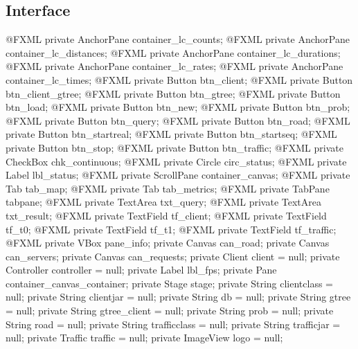 \subsection{Interface}
\nwenddocs{}\plusendmoddef
@FXML private AnchorPane container_lc_counts;
@FXML private AnchorPane container_lc_distances;
@FXML private AnchorPane container_lc_durations;
@FXML private AnchorPane container_lc_rates;
@FXML private AnchorPane container_lc_times;
@FXML private Button btn_client;
@FXML private Button btn_client_gtree;
@FXML private Button btn_gtree;
@FXML private Button btn_load;
@FXML private Button btn_new;
@FXML private Button btn_prob;
@FXML private Button btn_query;
@FXML private Button btn_road;
@FXML private Button btn_startreal;
@FXML private Button btn_startseq;
@FXML private Button btn_stop;
@FXML private Button btn_traffic;
@FXML private CheckBox chk_continuous;
@FXML private Circle circ_status;
@FXML private Label lbl_status;
@FXML private ScrollPane container_canvas;
@FXML private Tab tab_map;
@FXML private Tab tab_metrics;
@FXML private TabPane tabpane;
@FXML private TextArea txt_query;
@FXML private TextArea txt_result;
@FXML private TextField tf_client;
@FXML private TextField tf_t0;
@FXML private TextField tf_t1;
@FXML private TextField tf_traffic;
@FXML private VBox pane_info;
private Canvas can_road;
private Canvas can_servers;
private Canvas can_requests;
private Client client = null;
private Controller controller = null;
private Label lbl_fps;
private Pane container_canvas_container;
private Stage stage;
private String clientclass = null;
private String clientjar = null;
private String db = null;
private String gtree = null;
private String gtree_client = null;
private String prob = null;
private String road = null;
private String trafficclass = null;
private String trafficjar = null;
private Traffic traffic = null;
private ImageView logo = null;
\nwendcode{}\nwdocspar

